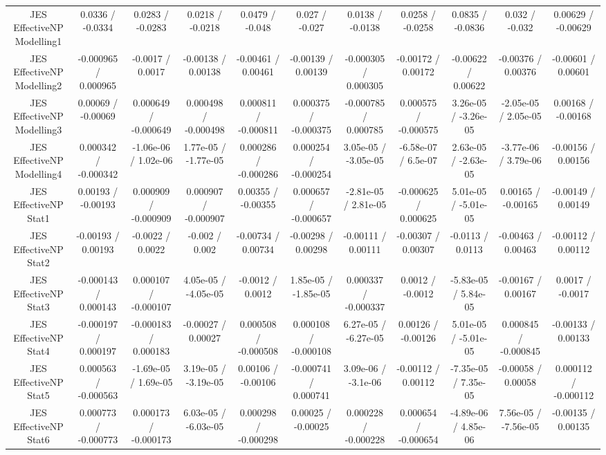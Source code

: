 \begin{table}[htbp]
\begin{center}
\begin{tabular}{|c|c|c|c|c|c|c|c|c|c|c|}
  JES EffectiveNP Modelling1 & 0.0336 / -0.0334 & 0.0283 / -0.0283 & 0.0218 / -0.0218 & 0.0479 / -0.048 & 0.027 / -0.027 & 0.0138 / -0.0138 & 0.0258 / -0.0258 & 0.0835 / -0.0836 & 0.032 / -0.032 & 0.00629 / -0.00629 \\ 
  JES EffectiveNP Modelling2 & -0.000965 / 0.000965 & -0.0017 / 0.0017 & -0.00138 / 0.00138 & -0.00461 / 0.00461 & -0.00139 / 0.00139 & -0.000305 / 0.000305 & -0.00172 / 0.00172 & -0.00622 / 0.00622 & -0.00376 / 0.00376 & -0.00601 / 0.00601 \\ 
  JES EffectiveNP Modelling3 & 0.00069 / -0.00069 & 0.000649 / -0.000649 & 0.000498 / -0.000498 & 0.000811 / -0.000811 & 0.000375 / -0.000375 & -0.000785 / 0.000785 & 0.000575 / -0.000575 & 3.26e-05 / -3.26e-05 & -2.05e-05 / 2.05e-05 & 0.00168 / -0.00168 \\ 
  JES EffectiveNP Modelling4 & 0.000342 / -0.000342 & -1.06e-06 / 1.02e-06 & 1.77e-05 / -1.77e-05 & 0.000286 / -0.000286 & 0.000254 / -0.000254 & 3.05e-05 / -3.05e-05 & -6.58e-07 / 6.5e-07 & 2.63e-05 / -2.63e-05 & -3.77e-06 / 3.79e-06 & -0.00156 / 0.00156 \\ 
  JES EffectiveNP Stat1 & 0.00193 / -0.00193 & 0.000909 / -0.000909 & 0.000907 / -0.000907 & 0.00355 / -0.00355 & 0.000657 / -0.000657 & -2.81e-05 / 2.81e-05 & -0.000625 / 0.000625 & 5.01e-05 / -5.01e-05 & 0.00165 / -0.00165 & -0.00149 / 0.00149 \\ 
  JES EffectiveNP Stat2 & -0.00193 / 0.00193 & -0.0022 / 0.0022 & -0.002 / 0.002 & -0.00734 / 0.00734 & -0.00298 / 0.00298 & -0.00111 / 0.00111 & -0.00307 / 0.00307 & -0.0113 / 0.0113 & -0.00463 / 0.00463 & -0.00112 / 0.00112 \\ 
  JES EffectiveNP Stat3 & -0.000143 / 0.000143 & 0.000107 / -0.000107 & 4.05e-05 / -4.05e-05 & -0.0012 / 0.0012 & 1.85e-05 / -1.85e-05 & 0.000337 / -0.000337 & 0.0012 / -0.0012 & -5.83e-05 / 5.84e-05 & -0.00167 / 0.00167 & 0.0017 / -0.0017 \\ 
  JES EffectiveNP Stat4 & -0.000197 / 0.000197 & -0.000183 / 0.000183 & -0.00027 / 0.00027 & 0.000508 / -0.000508 & 0.000108 / -0.000108 & 6.27e-05 / -6.27e-05 & 0.00126 / -0.00126 & 5.01e-05 / -5.01e-05 & 0.000845 / -0.000845 & -0.00133 / 0.00133 \\ 
  JES EffectiveNP Stat5 & 0.000563 / -0.000563 & -1.69e-05 / 1.69e-05 & 3.19e-05 / -3.19e-05 & 0.00106 / -0.00106 & -0.000741 / 0.000741 & 3.09e-06 / -3.1e-06 & -0.00112 / 0.00112 & -7.35e-05 / 7.35e-05 & -0.00058 / 0.00058 & 0.000112 / -0.000112 \\ 
  JES EffectiveNP Stat6 & 0.000773 / -0.000773 & 0.000173 / -0.000173 & 6.03e-05 / -6.03e-05 & 0.000298 / -0.000298 & 0.00025 / -0.00025 & 0.000228 / -0.000228 & 0.000654 / -0.000654 & -4.89e-06 / 4.85e-06 & 7.56e-05 / -7.56e-05 & -0.00135 / 0.00135 \\ 

\end{tabular}
\end{center}
\end{table}
